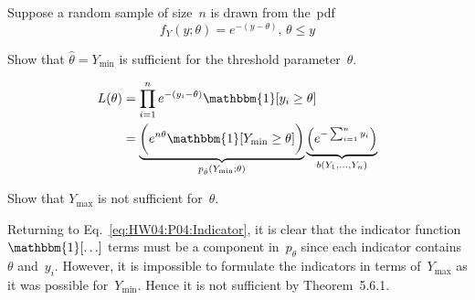 \begin{problem}
   Suppose a random sample of size~$n$ is drawn from the~pdf
  \begin{equation*}
    f_{Y}(y;\theta) = e^{-(y-\theta)}\text{,  } \theta \leq y
  \end{equation*}
\end{problem}

\begin{subproblem}
  Show that ${\hat{\theta} = Y_{\min}}$ is sufficient for the threshold parameter~$\theta$.
\end{subproblem}
\begin{align}
  L(\theta) &= \prod_{i=1}^{n} e^{-(y_i - \theta)} \mathbbm{1}\sbrack{y_i \geq \theta} \label{eq:HW04:P04:Indicator}\\
            &= \underbrace{\bigg(e^{n\theta} \mathbbm{1}\sbrack{Y_{\min} \geq \theta} \bigg)}_{p_{\hat{\theta}}(Y_{\min};\theta)} \underbrace{\left( e^{-\sum_{i=1}^{n} y_i}  \right)}_{b(Y_1,\ldots,Y_{n})}
\end{align}

\begin{subproblem}
  Show that $Y_{\max}$ is not sufficient for~$\theta$.
\end{subproblem}

Returning to Eq.~\ref{eq:HW04:P04:Indicator}, it is clear that the indicator function~$\mathbbm{1}\sbrack{\ldots}$ terms must be a component in~$p_{\hat{\theta}}$ since each indicator contains~$\theta$ and~$y_i$.  However, it is impossible to formulate the indicators in terms of~$Y_{\max}$ as it was possible for~${Y_{\min}}$.  Hence it is not sufficient by Theorem~5.6.1.
